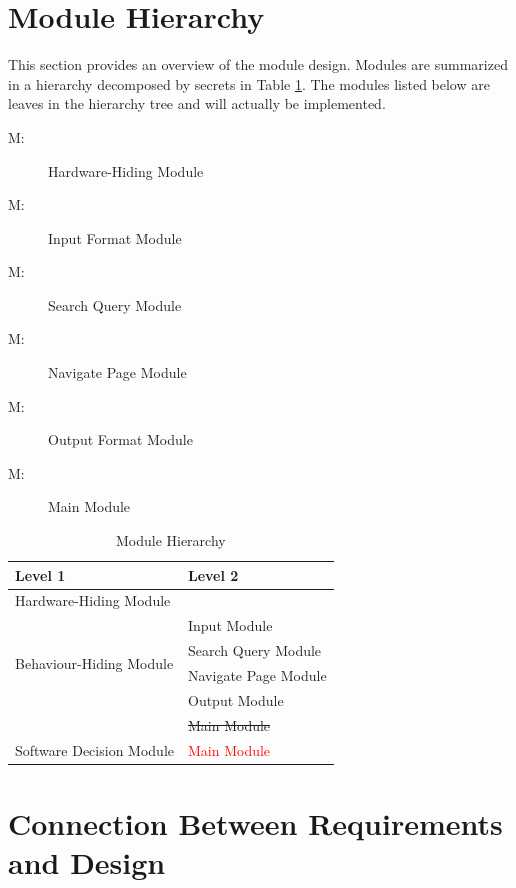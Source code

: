 \documentclass[12pt, titlepage]{article}
\newcounter{mnum}
\newcommand{\mthemnum}{M\themnum}
\begin{document}
\newpage

\section{Module Hierarchy} \label{SecMH}

This section provides an overview of the module design. Modules are summarized
in a hierarchy decomposed by secrets in Table \ref{TblMH}. The modules listed
below are leaves in the hierarchy tree and will actually be implemented.

\begin{description}
\item [ \mthemnum \label{mHH}:] Hardware-Hiding Module
\item [ \mthemnum \label{mInput}:] Input Format Module
\item [ \mthemnum \label{mSQ}:] Search Query Module
\item [ \mthemnum \label{mNP}:] Navigate Page Module
\item [ \mthemnum \label{mOutput}:] Output Format Module
\item [ \mthemnum \label{mMain}:] Main Module
\end{description}


\begin{table}[h!]
\centering
\begin{tabular}{p{} p{}}
\toprule
\textbf{Level 1} & \textbf{Level 2}\\
\midrule

{Hardware-Hiding Module} & ~ \\
\midrule

\multirow{4}{0.3\textwidth}{Behaviour-Hiding Module} 
& Input Module\\
& Search Query Module\\
& Navigate Page Module\\
& Output Module\\
& \st{Main Module}\\
\midrule

{Software Decision Module} & \textcolor{red}{Main Module} \\
\bottomrule

\end{tabular}
\caption{Module Hierarchy}
\label{TblMH}
\end{table}

\section{Connection Between Requirements and Design} \label{SecConnection}
\end{document}
